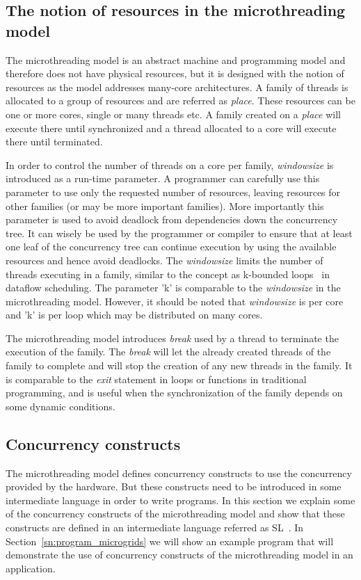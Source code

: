 \documentclass{article}
\begin{document}
\subsection{The notion of resources in the microthreading model}

The microthreading model is an abstract machine and programming model and
therefore does not have physical resources, but it is designed with the notion
of resources as the model addresses many-core architectures. A family of
threads is allocated to a group of resources and are referred as
\emph{place}. These resources can be one or more cores, single or many threads
etc. A family created on a \emph{place} will execute there until synchronized
and a thread allocated to a core will execute there until terminated. 

In order to control the number of threads on a core per family,
\emph{windowsize} is introduced as a run-time parameter. A programmer can
carefully use this parameter to use only the requested number of resources,
leaving resources for other families (or may be more important families). More
importantly this parameter is used to avoid deadlock from dependencies down the
concurrency tree. It can wisely be used by the programmer or compiler to ensure
that at least one leaf of the concurrency tree can continue execution by using
the available resources and hence avoid deadlocks. The \emph{windowsize} limits
the number of threads executing in a family, similar to the concept as
k-bounded loops~\cite{Culler:1988:RRD:633625.52417} in dataflow scheduling. The
parameter 'k' is comparable to the \emph{windowsize} in the microthreading
model. However, it should be noted that \emph{windowsize} is per core and 'k'
is per loop which may be distributed on many cores.

The microthreading model introduces \emph{break} used by a thread to terminate
the execution of the family. The \emph{break} will let the already created
threads of the family to complete and will stop the creation of any new threads
in the family. It is comparable to the \emph{exit} statement in loops or
functions in traditional programming, and is useful when the synchronization of
the family depends on some dynamic conditions.

\subsection{Concurrency constructs}\label{sn:conc_constructs}

The microthreading model defines concurrency constructs to use the concurrency
provided by the hardware. But these constructs need to be introduced in some
intermediate language in order to write programs. In this section we explain
some of the concurrency constructs of the microthreading model and show that
these constructs are defined in an intermediate language referred as
SL~\cite{poss.12, poss.12.sl}. In Section~\ref{sn:program_microgrids} we will show an
example program that will demonstrate the use of concurrency constructs of the
microthreading model in an application. 
\end{document}

